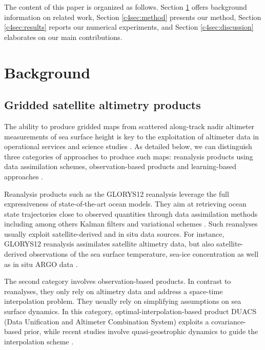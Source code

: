 \begin{bibunit}
    
The content of this paper is organized as follows. Section \ref{c4sec:background} offers background information on related work, Section \ref{c4sec:method} presents our method, Section \ref{c4sec:results} reports our numerical experiments, and Section \ref{c4sec:discussion} elaborates on our main contributions.




\section{Background}
\label{c4sec:background}
\subsection*{Gridded satellite altimetry products}
\label{c4ssec:interpolation}
The ability to produce gridded maps from scattered along-track nadir altimeter measurements of sea surface height is key to the exploitation of altimeter data in operational services and science studies \cite{abdallaAltimetryFutureBuilding2021}.
As detailed below, we can distinguish three categories of approaches to produce such maps: reanalysis products \cite{jean-michelCopernicusGlobal122021} using data assimilation schemes, observation-based products \cite{taburetDUACSDT2018252019} and learning-based approaches \cite{fabletENDTOENDPHYSICSINFORMEDREPRESENTATION2021}.

Reanalysis products such as the GLORYS12 reanalysis \cite{jean-michelCopernicusGlobal122021} leverage the full expressiveness of state-of-the-art ocean models. They aim at retrieving ocean state trajectories close to observed quantities through data assimilation methods including among others Kalman filters and variational schemes \cite{carrassiDataAssimilationGeosciences2018}. Such reanalyses usually exploit satellite-derived and in situ data sources. For instance, GLORYS12 reanalysis assimilates satellite altimetry data, but also satellite-derived observations of the sea surface temperature, sea-ice concentration as well as in situ ARGO data  \cite{wongArgoData19992020}.


The second category involves observation-based products. In contrast to reanalyses, they only rely on altimetry data and address a space-time interpolation problem. They usually rely on simplifying assumptions on sea surface dynamics. In this category, optimal-interpolation-based product DUACS (Data Unification and Altimeter Combination System) \cite{taburetDUACSDT2018252019} exploits a covariance-based prior, while recent studies involve quasi-geostrophic dynamics to guide the interpolation scheme \cite{guillouMappingAltimetryForthcoming2021,ballarottaDynamicMappingAlongTrack2020}.


\end{bibunit}
